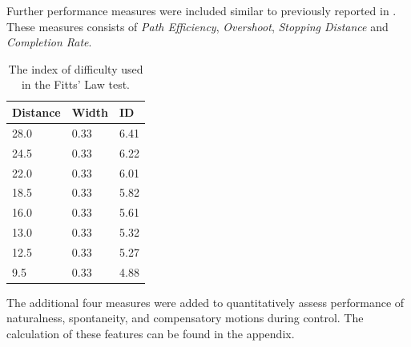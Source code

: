 Further performance measures were included similar to previously reported in \cite{Scheme2013, Scheme2013a}. These measures consists of \textit{Path Efficiency}, \textit{Overshoot}, \textit{Stopping Distance} and \textit{Completion Rate}.
\begin{table}[H]
	\centering
	\caption{The index of difficulty used in the Fitts' Law test.}
	\label{tab:P:ID}
	\begin{tabular}{lll}
		
		Distance		 & Width	         & ID				   \\ \hline \hline
		28.0     & 0.33 & 6.41                \\ %
		24.5     & 0.33 & 6.22                \\ %
		22.0     & 0.33 & 6.01                \\ %
		18.5     & 0.33 & 5.82                \\ %
		16.0     & 0.33 & 5.61                \\ %
		13.0     & 0.33 & 5.32                \\ %
		12.5     & 0.33 & 5.27                \\ %
		9.5      & 0.33 & 4.88                \\ \hline \hline
	\end{tabular}
\end{table}
The additional four measures were added to quantitatively assess performance of naturalness, spontaneity, and compensatory motions during control. The calculation of these features can be found in the appendix. 